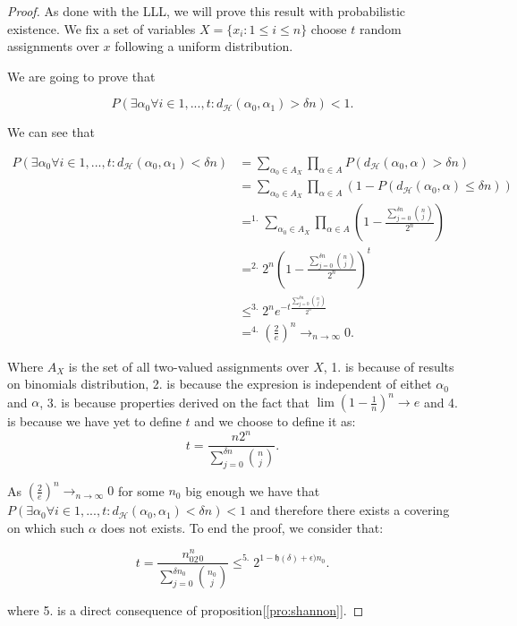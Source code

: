 \begin{proof}
  As done with the LLL, we will prove this result with probabilistic existence. We fix a set of variables $X=\{ x_i : 1 \le i \le n\}$ choose $t$ random assignments over $x$ following a uniform distribution. 

  We are going to prove that

  $$P(\exists \alpha_0 \forall i\in 1,...,t : d_\mathcal{H} (\alpha_0,\alpha_1)  > \delta n) < 1.$$

  We can see that 

\begin{equation}
\begin{split}
  P(\exists \alpha_0 \forall i\in 1,...,t : d_\mathcal{H} (\alpha_0,\alpha_1)  < \delta n)  & =  \sum_{\alpha_0\in A_{X} } \prod_{\alpha \in A} P(d_{\mathcal{H}} (\alpha_0,\alpha) > \delta n)\\
  & =  \sum_{\alpha_0\in A_{X} } \prod_{\alpha \in A} \left ( 1-P(d_{\mathcal{H}} (\alpha_0,\alpha) \le \delta n) \right )\\
  & =^{1.}  \sum_{\alpha_0\in A_{X} } \prod_{\alpha \in A} \left ( 1- \frac{\sum_{j=0}^{\delta n} {n\choose j}}{2^n} \right )\\
  & =^{2.}  2^n \left ( 1- \frac{\sum_{j=0}^{\delta n} {n\choose j}}{2^n} \right )^t\\
  & \le^{3.}  2^n  e^{-t \frac{\sum_{j=0}^{\delta n} {n\choose j}}{2^n}}\\
  & =^{4.}  \left (\frac{2}{e}\right )^n  \to_{n\to \infty} 0. 
\end{split}
\end{equation}

Where $A_{X}$ is the set of all two-valued assignments over $X$, 1. is because of results on binomials distribution, 2. is because the expresion is independent of eithet $\alpha_0$ and $\alpha$, 3. is because properties derived on the fact that $\lim (1-\frac{1}{n})^n \to e$ and 4. is because we have yet to define $t$ and we choose to define it as:
$$ t = \frac{n2^n}{\sum_{j=0}^{\delta n} {n\choose j}}.$$

As  $\left (\frac{2}{e}\right )^n  \to_{n\to \infty} 0 $ for some $n_0$ big enough we have that $P(\exists \alpha_0 \forall i\in 1,...,t : d_\mathcal{H} (\alpha_0,\alpha_1)  < \delta n) < 1$ and therefore there exists a covering on which  such $\alpha$ does not exists. To end the proof, we consider that:

$$ t = \frac{n_02^n_0}{\sum_{j=0}^{\delta n_0} {n_0\choose j}} \le^{5.} 2^{1-\mathfrak{h}(\delta)+\epsilon)n_0}.$$

where 5. is a direct consequence of proposition[\ref{pro:shannon}].

\end{proof}

